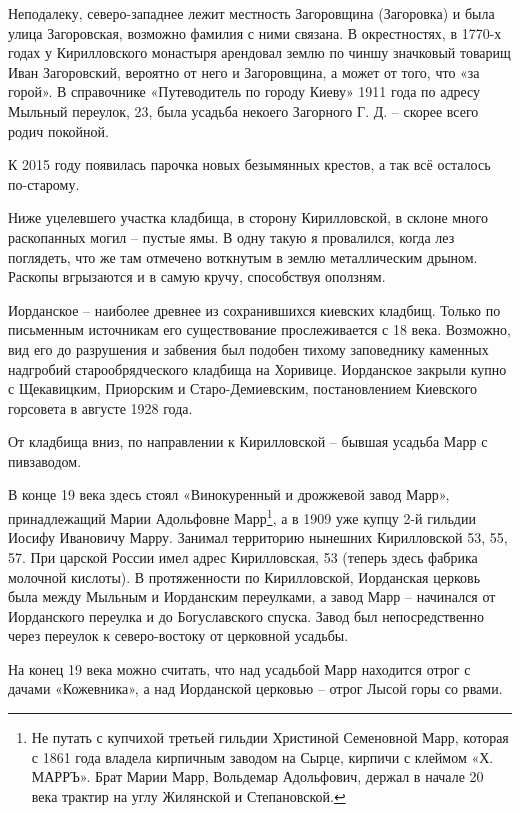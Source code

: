 \newpage

Неподалеку, северо-западнее лежит местность Загоровщина (Загоровка) и была улица Загоровская, возможно фамилия с ними связана. В окрестностях, в 1770-х годах у Кирилловского монастыря арендовал землю по чиншу значковый товарищ Иван Загоровский, вероятно от него и Загоровщина, а может от того, что «за горой». В справочнике «Путеводитель по городу Киеву» 1911 года по адресу Мыльный переулок, 23, была усадьба некоего Загорного Г. Д. – скорее всего родич покойной.

К 2015 году появилась парочка новых безымянных крестов, а так всё осталось по-старому.

Ниже уцелевшего участка кладбища, в сторону Кирилловской, в склоне много раскопанных могил – пустые ямы. В одну такую я провалился, когда лез поглядеть, что же там отмечено воткнутым в землю металлическим дрыном. Раскопы вгрызаются и в самую кручу, способствуя оползням.

Иорданское – наиболее древнее из сохранившихся киевских кладбищ. Только по письменным источникам его существование прослеживается с 18 века. Возможно, вид его до разрушения и забвения был подобен тихому заповеднику каменных надгробий старообрядческого кладбища на Хоривице. Иорданское закрыли купно с Щекавицким, Приорским и Старо-Демиевским, постановлением Киевского горсовета в августе 1928 года.

От кладбища вниз, по направлении к Кирилловской – бывшая усадьба Марр с пивзаводом.

В конце 19 века здесь стоял «Винокуренный и дрожжевой завод Марр», принадлежащий Марии Адольфовне Марр\footnote{Не путать с купчихой третьей гильдии Христиной Семеновной Марр, которая с 1861 года владела кирпичным заводом на Сырце, кирпичи с клеймом «Х. МАРРЪ». Брат Марии Марр, Вольдемар Адольфович, держал в начале 20 века трактир на углу Жилянской и Степановской.}, а в 1909 уже купцу 2-й гильдии Иосифу Ивановичу Марру. Занимал территорию нынешних Кирилловской 53, 55, 57. При царской России имел адрес Кирилловская, 53 (теперь здесь фабрика молочной кислоты). В протяженности по Кирилловской, Иорданская церковь была между Мыльным и Иорданским переулками, а завод Марр – начинался от Иорданского переулка и до Богуславского спуска. Завод был непосредственно через переулок к северо-востоку от церковной усадьбы.

На конец 19 века можно считать, что над усадьбой Марр находится отрог с дачами «Кожевника», а над Иорданской церковью – отрог Лысой горы со рвами.

